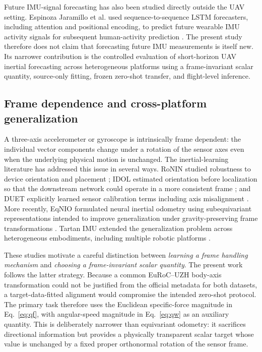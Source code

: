 \documentclass[preprint,12pt]{elsarticle}
\begin{document}
Future IMU-signal forecasting has also been studied directly outside the UAV setting. Espinoza Jaramillo et al. used sequence-to-sequence LSTM forecasters, including attention and positional encoding, to predict future wearable IMU activity signals for subsequent human-activity prediction \cite{EspinozaJaramillo2023IMUForecast}. The present study therefore does not claim that forecasting future IMU measurements is itself new. Its narrower contribution is the controlled evaluation of short-horizon UAV inertial forecasting across heterogeneous platforms using a frame-invariant scalar quantity, source-only fitting, frozen zero-shot transfer, and flight-level inference.

\subsection{Frame dependence and cross-platform generalization}

A three-axis accelerometer or gyroscope is intrinsically frame dependent: the individual vector components change under a rotation of the sensor axes even when the underlying physical motion is unchanged. The inertial-learning literature has addressed this issue in several ways. RoNIN studied robustness to device orientation and placement \cite{Herath2020RoNIN}; IDOL estimated orientation before localization so that the downstream network could operate in a more consistent frame \cite{Sun2021IDOL}; and DUET explicitly learned sensor calibration terms including axis misalignment \cite{Liu2023DUET}. More recently, EqNIO formulated neural inertial odometry using subequivariant representations intended to improve generalization under gravity-preserving frame transformations \cite{Jayanth2025EqNIO}. Tartan IMU extended the generalization problem across heterogeneous embodiments, including multiple robotic platforms \cite{Zhao2025TartanIMU}.

These studies motivate a careful distinction between \emph{learning a frame handling mechanism} and \emph{choosing a frame-invariant scalar quantity}. The present work follows the latter strategy. Because a common EuRoC--UZH body-axis transformation could not be justified from the official metadata for both datasets, a target-data-fitted alignment would compromise the intended zero-shot protocol. The primary task therefore uses the Euclidean specific-force magnitude in Eq.~\eqref{eq:qf}, with angular-speed magnitude in Eq.~\eqref{eq:qw} as an auxiliary quantity. This is deliberately narrower than equivariant odometry: it sacrifices directional information but provides a physically transparent scalar target whose value is unchanged by a fixed proper orthonormal rotation of the sensor frame.
\end{document}
